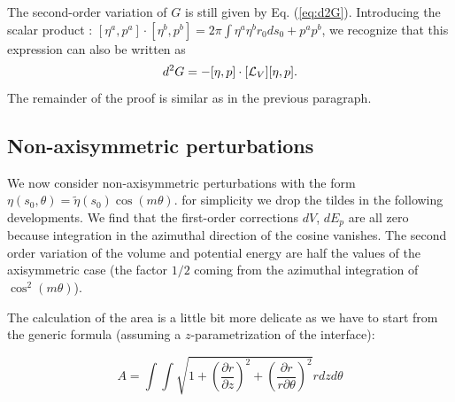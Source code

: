 \documentclass{jfm}
\newcommand\be{\begin{equation}}
\newcommand\ee{\end{equation}}
\newcommand\DP[2]{\frac{\partial #1}{\partial #2}}
\begin{document}



The second-order variation of $G$ is still given by Eq. (\ref{eq:d2G}). 
Introducing the scalar product : $[\eta^a,p^a] \cdot [\eta^b,p^b] = 2 \pi \int \eta^a \eta^b r_0 d s_0 + p^a p^b$, we recognize that this expression can also be written as
\be
d^2 G = - [\eta,p]  \cdot  [{\cal L}_V] [\eta,p].
\ee
The remainder of the proof is similar as in the previous paragraph.


\subsection{Non-axisymmetric perturbations}



We now consider non-axisymmetric perturbations with the form 
$\eta(s_0, \theta) = \tilde{\eta}(s_0) \cos ( m \theta)$. for simplicity we drop the tildes in the following developments.
We find that the first-order corrections $d V$, $d E_{p}$
are all zero because integration in the azimuthal direction of the cosine vanishes.
The second order variation of the volume and potential energy are half the values of the axisymmetric case (the factor $1/2$ coming from the azimuthal integration of $\cos^2 (m \theta)$). 

The calculation of the area is a little bit more delicate as we have to start from the generic formula (assuming a $z$-parametrization of the interface):

\be
A = \int\int \sqrt{ 1 + \left(\DP{r}{z}\right)^2 +\left(\frac{\partial r}{r \partial \theta }\right)^2}  r d z d \theta 
\ee
\end{document}

